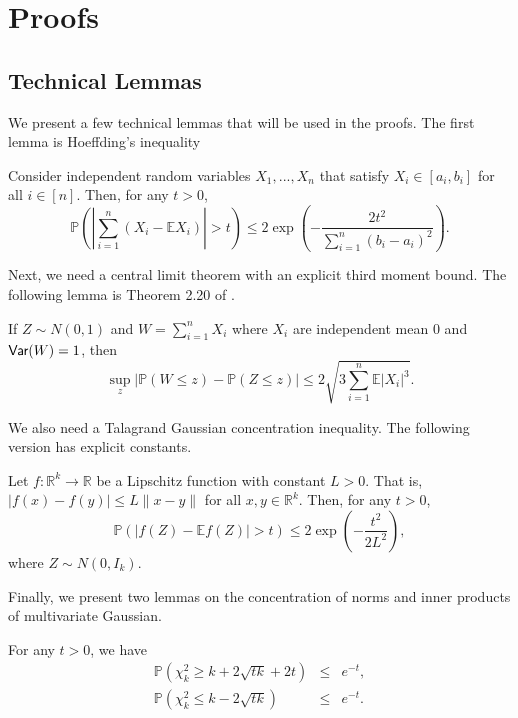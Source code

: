 


\section{Proofs}
\label{sec:proof}

\subsection{Technical Lemmas}

We present a few technical lemmas that will be used in the proofs. The first lemma is Hoeffding's inequality
\begin{lemma}\label{lem:hoeffding}
Consider independent random variables $X_1,...,X_n$ that satisfy $X_i\in[a_i,b_i]$ for all $i\in[n]$. Then, for any $t>0$,
$$\mathbb{P}\left(\left|\sum_{i=1}^n(X_i-\mathbb{E}X_i)\right|>t\right) \leq 2\exp\left(-\frac{2t^2}{\sum_{i=1}^n(b_i-a_i)^2}\right).$$
\end{lemma}

Next, we need a central limit theorem with an explicit third moment bound. The following lemma is Theorem 2.20 of \cite{ross2007second}.
\begin{lemma}\label{lem:stein}
If $Z\sim N(0,1)$ and $W=\sum_{i=1}^nX_i$ where $X_i$ are independent mean $0$ and $\textsf{Var}(W)=1$, then
$$\sup_z\left|\mathbb{P}(W\leq z)-\mathbb{P}(Z\leq z)\right|\leq 2\sqrt{3\sum_{i=1}^n\mathbb{E}|X_i|^3}.$$
\end{lemma}

We also need a Talagrand Gaussian concentration inequality. The following version has explicit constants.
\begin{lemma}\label{lem:talagrand}
Let $f:\mathbb{R}^k\rightarrow\mathbb{R}$ be a Lipschitz function with constant $L>0$. That is, $|f(x)-f(y)|\leq L\|x-y\|$ for all $x,y\in\mathbb{R}^k$. Then, for any $t>0$,
$$\mathbb{P}\left(|f(Z)-\mathbb{E}f(Z)|>t\right)\leq 2\exp\left(-\frac{t^2}{2L^2}\right),$$
where $Z\sim N(0,I_k)$.
\end{lemma}

Finally, we present two lemmas on the concentration of norms and inner products of multivariate Gaussian.
\begin{lemma}\label{lem:chi-squared}
For any $t>0$, we have
\begin{eqnarray*}
\mathbb{P}\left(\chi_k^2\geq k+2\sqrt{tk}+2t\right) &\leq& e^{-t}, \\
\mathbb{P}\left(\chi_k^2\leq k-2\sqrt{tk}\right) &\leq& e^{-t}.
\end{eqnarray*}
\end{lemma}

